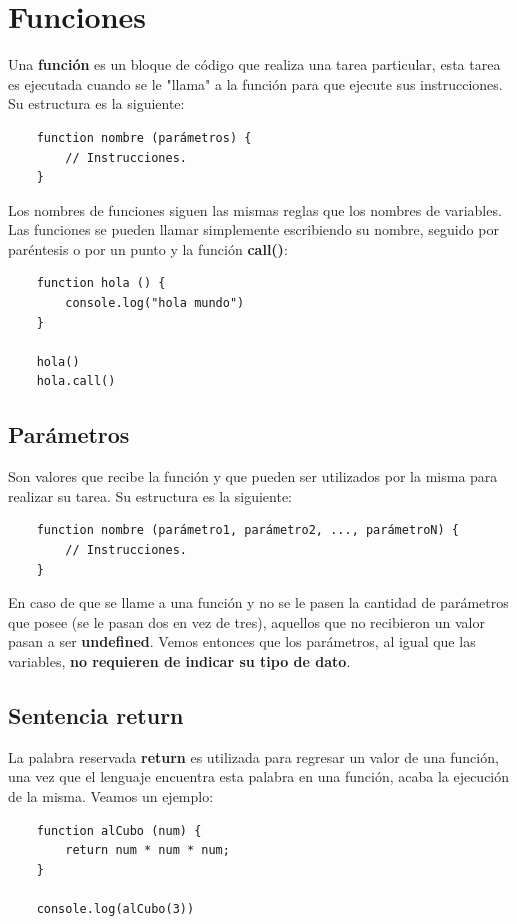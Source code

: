 \section{Funciones}
\hspace{0.55cm}Una \textbf{función} es un bloque de código que realiza una tarea particular, esta tarea es ejecutada cuando se le "llama" a la función para que ejecute sus instrucciones. Su estructura es la siguiente:
\begin{lstlisting}
    function nombre (parámetros) {
        // Instrucciones.
    }
\end{lstlisting}

Los nombres de funciones siguen las mismas reglas que los nombres de variables. Las funciones se pueden llamar simplemente escribiendo su nombre, seguido por paréntesis o por un punto y la función \textbf{call()}:
\begin{lstlisting}
    function hola () {
        console.log("hola mundo")
    }

    hola()
    hola.call()
\end{lstlisting}


\subsection{Parámetros}
\hspace{0.55cm}Son valores que recibe la función y que pueden ser utilizados por la misma para realizar su tarea. Su estructura es la siguiente:
\begin{lstlisting}
    function nombre (parámetro1, parámetro2, ..., parámetroN) {
        // Instrucciones.
    }
\end{lstlisting}

En caso de que se llame a una función y no se le pasen la cantidad de parámetros que posee (se le pasan dos en vez de tres), aquellos que no recibieron un valor pasan a ser \textbf{undefined}. Vemos entonces que los parámetros, al igual que las variables, \textbf{no requieren de indicar su tipo de dato}.


\subsection{Sentencia return}
\hspace{0.55cm}La palabra reservada \textbf{return} es utilizada para regresar un valor de una función, una vez que el lenguaje encuentra esta palabra en una función, acaba la ejecución de la misma. Veamos un ejemplo:
\begin{lstlisting}
    function alCubo (num) {
        return num * num * num;
    }

    console.log(alCubo(3))
\end{lstlisting}

